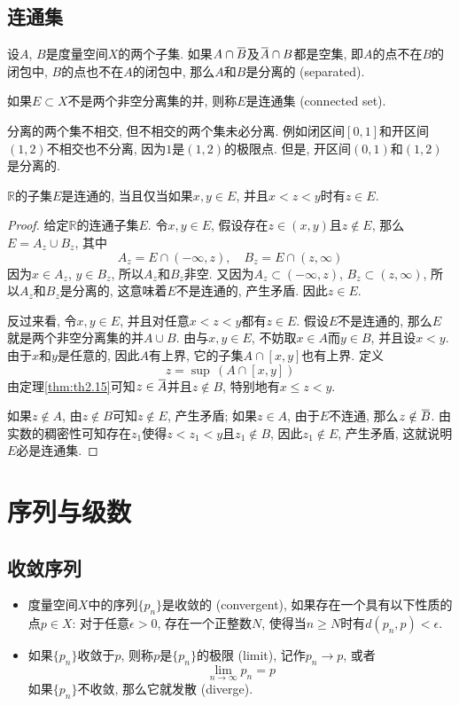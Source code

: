 \documentclass[cn,12pt,math=mtpro2,citestyle=gb7714-2015,bibstyle=gb7714-2015,twocol]{elegantbook}
\newcommand{\R}{\mathbb{R}}
\newcommand{\limn }{\lim_{n\to\infty}}
\newcommand{\overbar}[1]{\mkern 1.5mu\overline{\mkern-1.5mu#1\mkern-1.5mu}\mkern 1.5mu}
\begin{document}
\section{连通集}
\begin{definition}
设$A$, $B$是度量空间$X$的两个子集. 如果$A\cap\overbar{B}$及$\overbar{A}\cap B$都是空集, 即$A$的点不在$B$的闭包中, $B$的点也不在$A$的闭包中, 那么$A$和$B$是分离的 (separated).

如果$E\subset X$不是两个非空分离集的并, 则称$E$是连通集 (connected set).
\end{definition}
\begin{remark}
分离的两个集不相交, 但不相交的两个集未必分离. 例如闭区间$[0,1]$和开区间$(1,2)$不相交也不分离, 因为$1$是$(1,2)$的极限点. 但是, 开区间$(0,1)$和$(1,2)$是分离的.
\end{remark}
\begin{theorem}\label{thm:th2.19}
  $\R$的子集$E$是连通的, 当且仅当如果$x,y\in E$, 并且$x<z<y$时有$z\in E$.
\end{theorem}
\begin{proof}
  给定$\R$的连通子集$E$. 令$x,y\in E$, 假设存在$z\in (x,y)$且$z\notin E$, 那么$E=A_z\cup B_z$, 其中
  $$A_z=E\cap (-\infty,z),\quad B_z=E\cap(z,\infty)$$
  因为$x\in A_z$, $y\in B_z$, 所以$A_z$和$B_z$非空. 又因为$A_z\subset(-\infty,z)$, $B_z\subset(z,\infty)$, 所以$A_z$和$B_z$是分离的, 这意味着$E$不是连通的, 产生矛盾. 因此$z\in E$.

  反过来看, 令$x,y\in E$, 并且对任意$x<z<y$都有$z\in E$. 假设$E$不是连通的, 那么$E$就是两个非空分离集的并$A\cup B$. 由与$x,y\in E$, 不妨取$x\in A$而$y \in B$, 并且设$x<y$. 由于$x$和$y$是任意的, 因此$A$有上界, 它的子集$A\cap[x,y]$也有上界. 定义
  $$z=\sup\, (A\cap [x,y])$$
  由定理\ref{thm:th2.15}可知$z\in \overbar{A}$并且$z\notin B$, 特别地有$x\leq z<y$.

  如果$z\notin A$, 由$z\notin B$可知$z\notin E$, 产生矛盾; 如果$z\in A$, 由于$E$不连通, 那么$z\notin \overbar{B}$. 由实数的稠密性可知存在$z_1$使得$z<z_1<y$且$z_1\notin B$, 因此$z_1\notin E$, 产生矛盾, 这就说明$E$必是连通集.


\end{proof}
\chapter{序列与级数}
\section{收敛序列}
\begin{definition}
\begin{itemize}
\item 度量空间$X$中的序列$\{p_n\}$是收敛的 (convergent), 如果存在一个具有以下性质的点$p\in X$: 对于任意$\epsilon>0$, 存在一个正整数$N$, 使得当$n\geq N$时有$d(p_n,p)<\epsilon$.

\item 如果$\{p_n\}$收敛于$p$, 则称$p$是$\{p_n\}$的极限 (limit), 记作$p_n\rightarrow p$, 或者
$$\limn  p_n=p$$
如果$\{p_n\}$不收敛, 那么它就发散 (diverge).
\end{itemize}
\end{definition}
\end{document}
